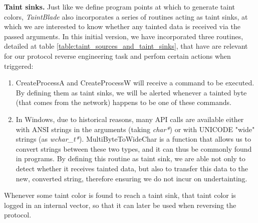 \documentclass[conference]{IEEEtran}
\begin{document}
\textbf{Taint sinks.} Just like we define program points at which to generate taint colors,
\textit{TaintBlade} also incorporates a series of routines acting as taint sinks,
at which we are interested to know whether any tainted data is received via the passed
arguments. In this initial version, we have incorporated three routines, detailed at
table \ref{table:taint_sources_and_taint_sinks}, that have are relevant for our protocol
reverse engineering task and perfom certain actions when triggered:
\begin{enumerate}
    \item CreateProcessA and CreateProcessW will receive a command to be executed. By
          defining them as taint sinks, we will be alerted whenever a tainted byte (that
          comes from the network) happens to be one of these commands.
    \item In Windows, due to historical reasons, many API calls are available either with
          ANSI strings in the arguments (taking \textit{char*}) or with UNICODE "wide"
          strings (as \textit{wchar\_t*}). MultiByteToWideChar is a function that allows
          us to convert strings between these two types, and it can thus be commonly
          found in programs. By defining this routine as taint sink, we are able not only
          to detect whether it receives tainted data, but also to transfer this data to
          the new, converted string, therefore ensuring we do not incur on undertainting.
\end{enumerate}

Whenever some taint color is found to reach a taint sink, that taint color is
logged in an internal vector, so that it can later be used when reversing the
protocol.
\end{document}
